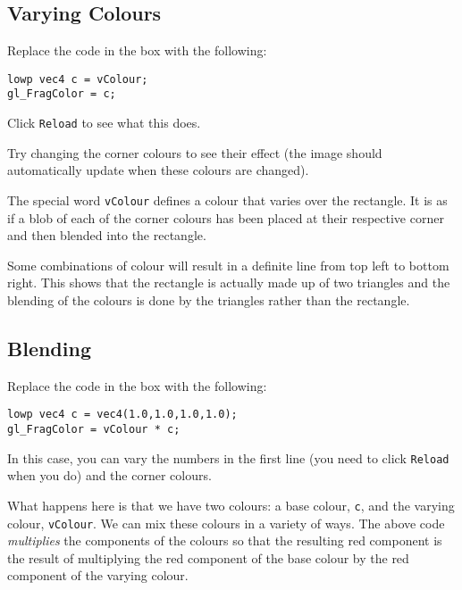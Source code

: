 \documentclass[
  html5,%
  mathml,%
  use filename%
]{internet}
\begin{document}
\subsection{Varying Colours}

Replace the code in the box with the following:

\begin{tcolorbox}
\begin{verbatim}
lowp vec4 c = vColour;
gl_FragColor = c;
\end{verbatim}
\end{tcolorbox}

Click \verb+Reload+ to see what this does.

Try changing the corner colours to see their effect (the image should automatically update when these colours are changed).

\begin{tcolorbox}
The special word \verb+vColour+ defines a colour that varies over the rectangle.
It is as if a blob of each of the corner colours has been placed at their respective corner and then blended into the rectangle.

Some combinations of colour will result in a definite line from top left to bottom right.
This shows that the rectangle is actually made up of two triangles and the blending of the colours is done by the triangles rather than the rectangle.  
\end{tcolorbox}

\subsection{Blending}

Replace the code in the box with the following:

\begin{tcolorbox}
\begin{verbatim}
lowp vec4 c = vec4(1.0,1.0,1.0,1.0);
gl_FragColor = vColour * c;
\end{verbatim}
\end{tcolorbox}

In this case, you can vary the numbers in the first line (you need to click \verb+Reload+ when you do) and the corner colours.

\begin{tcolorbox}
What happens here is that we have two colours: a base colour, \verb+c+, and the varying colour, \verb+vColour+.
We can mix these colours in a variety of ways.
The above code \emph{multiplies} the components of the colours so that the resulting red component is the result of multiplying the red component of the base colour by the red component of the varying colour.
\end{tcolorbox}
\end{document}
